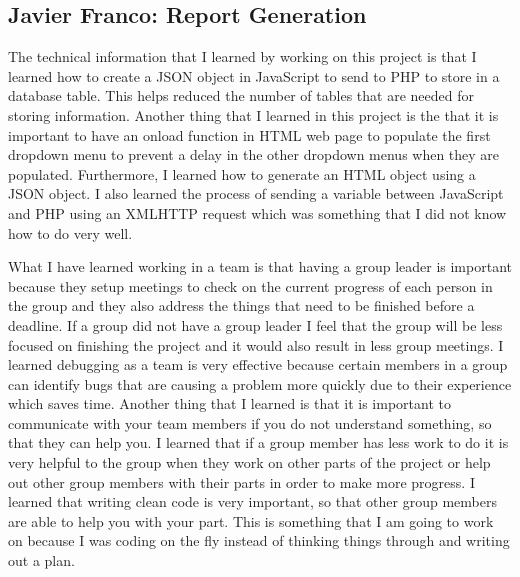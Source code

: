\documentclass[../final.tex]{subfiles}
\begin{document}
\subsection{Javier Franco: Report Generation}
The technical information that I learned by working on this project is that I learned how to create a JSON object in JavaScript to send to PHP to store in a database table. This helps reduced the number of tables that are needed for storing information. Another thing that I learned in this project is the that it is important to have an onload function in HTML web page to populate the first dropdown menu to prevent a delay in the other dropdown menus when they are populated. Furthermore, I learned how to generate an HTML object using a JSON object. I also learned the process of sending a variable between JavaScript and PHP using an XMLHTTP request which was something that I did not know how to do very well. 

 What I have learned working in a team is that having a group leader is important because they setup meetings to check on the current progress of each person in the group and they also address the things that need to be finished before a deadline. If a group did not have a group leader I feel that the group will be less focused on finishing the project and it would also result in less group meetings. I learned debugging as a team is very effective because certain members in a group can identify bugs that are causing a problem more quickly due to their experience which saves time. Another thing that I learned is that it is important to communicate with your team members if you do not understand something, so that they can help you. I learned that if a group member has less work to do it is very helpful to the group when they work on other parts of the project or help out other group members with their parts in order to make more progress. I learned that writing clean code is very important, so that other group members are able to help you with your part. This is something that I am going to work on because I was coding on the fly instead of thinking things through and writing out a plan.
 
\end{document}
